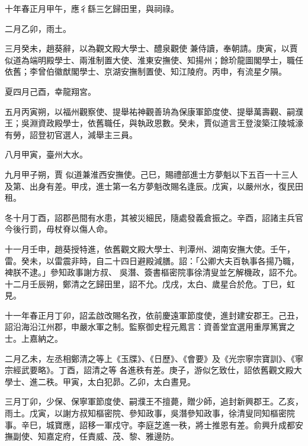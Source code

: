 \begin{pinyinscope}
 十年春正月甲午，應彳繇三乞歸田里，與祠祿。



 二月乙卯，雨土。



 三月癸未，趙葵辭，以為觀文殿大學士、醴泉觀使
 兼侍讀，奉朝請。庚寅，以賈似道為端明殿學士、兩淮制置大使、淮東安撫使、知揚州；餘玠龍圖閣學士，職任依舊；李曾伯徽猷閣學士、京湖安撫制置使、知江陵府。丙申，有流星夕隕。



 夏四月己酉，幸龍翔宮。



 五月丙寅朔，以福州觀察使、提舉祐神觀善珘為保康軍節度使、提舉萬壽觀、嗣濮王；吳淵資政殿學士，依舊職任，與執政恩數。癸未，賈似道言王登浚築江陵城濠有勞，詔登初官選人，減舉主三員。



 八月甲寅，臺州大水。



 九月甲子朔，賈
 似道兼淮西安撫使。己巳，賜禮部進士方夢魁以下五百一十三人及第、出身有差。甲戌，進士第一名方夢魁改賜名逢辰。戊寅，以嚴州水，復民田租。



 冬十月丁酉，詔郡邑間有水患，其被災細民，隨處發義倉振之。辛酉，詔諸主兵官今後行罰，毋杖脊以傷人命。



 十一月壬申，趙葵授特進，依舊觀文殿大學士、判潭州、湖南安撫大使。壬午，雷。癸未，以雷震非時，自二十四日避殿減膳。詔：「公卿大夫百執事各揚乃職，裨朕不逮。」參知政事謝方叔、
 吳潛、簽書樞密院事徐清叟並乞解機政，詔不允。十二月壬辰朔，鄭清之乞歸田里，詔不允。戊戌，太白、歲星合於危。丁巳，虹見。



 十一年春正月丁卯，詔孟啟改賜名孜，依前慶遠軍節度使，進封建安郡王。己丑，詔沿海沿江州郡，申嚴水軍之制。監察御史程元鳳言：資善堂宜選用重厚篤實之士。上嘉納之。



 二月乙未，左丞相鄭清之等上《玉牒》、《日歷》、《會要》及《光宗寧宗寶訓》、《寧宗經武要略》。丁酉，詔清之等
 各進秩有差。庚子，游似乞致仕，詔依舊觀文殿大學士、進二秩。甲寅，太白犯昴。乙卯，太白晝見。



 三月丁卯，少保、保寧軍節度使、嗣濮王不擅薨，贈少師，追封新興郡王。乙亥，雨土。戊寅，以謝方叔知樞密院、參知政事，吳潛參知政事，徐清叟同知樞密院事。辛巳，城寶應，詔移一軍戍守。李庭芝進一秩，將士推恩有差。俞興升成都安撫副使、知嘉定府，任責威、茂、黎、雅邊防。




\end{pinyinscope}
